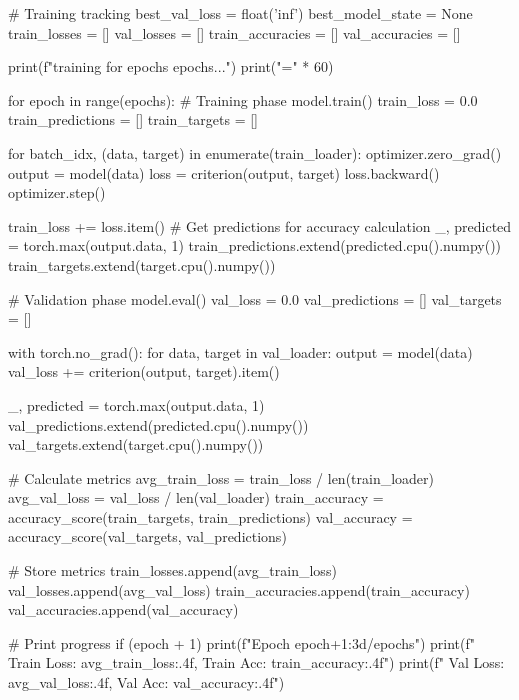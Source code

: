 \begin{aivncodebox}
\begin{python}
        # Training tracking
        best_val_loss = float('inf')
        best_model_state = None
        train_losses = []
        val_losses = []
        train_accuracies = []
        val_accuracies = []
        
        print(f"\nStarting training for {epochs} epochs...")
        print("=" * 60)
        
        for epoch in range(epochs):
            # Training phase
            model.train()
            train_loss = 0.0
            train_predictions = []
            train_targets = []
            
            for batch_idx, (data, target) in enumerate(train_loader):
                optimizer.zero_grad()
                output = model(data)
                loss = criterion(output, target)
                loss.backward()
                optimizer.step()
                
                train_loss += loss.item()
                # Get predictions for accuracy calculation
                _, predicted = torch.max(output.data, 1)
                train_predictions.extend(predicted.cpu().numpy())
                train_targets.extend(target.cpu().numpy())
            
            # Validation phase
            model.eval()
            val_loss = 0.0
            val_predictions = []
            val_targets = []
            
            with torch.no_grad():
                for data, target in val_loader:
                    output = model(data)
                    val_loss += criterion(output, target).item()
                    
                    _, predicted = torch.max(output.data, 1)
                    val_predictions.extend(predicted.cpu().numpy())
                    val_targets.extend(target.cpu().numpy())
            
            # Calculate metrics
            avg_train_loss = train_loss / len(train_loader)
            avg_val_loss = val_loss / len(val_loader)
            train_accuracy = accuracy_score(train_targets, train_predictions)
            val_accuracy = accuracy_score(val_targets, val_predictions)
            
            # Store metrics
            train_losses.append(avg_train_loss)
            val_losses.append(avg_val_loss)
            train_accuracies.append(train_accuracy)
            val_accuracies.append(val_accuracy)
            
            # Print progress
            if (epoch + 1) %
                print(f"Epoch {epoch+1:3d}/{epochs}")
                print(f"  Train Loss: {avg_train_loss:.4f}, Train Acc: {train_accuracy:.4f}")
                print(f"  Val Loss:   {avg_val_loss:.4f}, Val Acc:   {val_accuracy:.4f}")
            

\end{python}
\end{aivncodebox}
